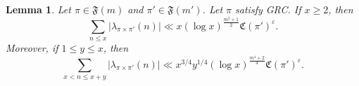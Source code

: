 \documentclass[12pt,reqno]{amsart}
\newtheorem{lem}[thm]{Lemma}
\theoremstyle{remark}
\numberwithin{equation}{section}
\begin{document}
  
    \begin{lem}
        \label{lem:3.3-Sound} 
        Let $\pi \in \mathfrak{F}(m)$ and $ \pi' \in \mathfrak{F}(m')$. Let $\pi$ satisfy GRC. If $x \ge 2$, then
	\begin{equation}
        \label{eq:partialsum-rankin-selberg}
            \sum_{n\le x}|\lambda_{\pi\times\pi'}(n)| \ll x(\log x)^{\frac{m^2+1}{2}}\mathfrak{C}(\pi')^{\varepsilon}.
	\end{equation}
        Moreover, if $1 \le y \le x$, then
        \begin{equation}
        \label{eq:shortsum-rankin-selberg}
            \sum_{x < n\le x+y}|\lambda_{\pi\times\pi'}(n)| \ll x^{3/4}y^{1/4}(\log x)^{\frac{m^4+2}{4}}\mathfrak{C}(\pi')^{\varepsilon}.
	\end{equation}	
    \end{lem}
\end{document}
